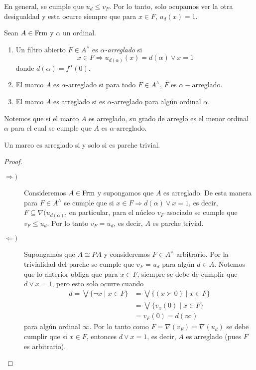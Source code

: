 En general, se cumple que $u_d\leq v_F$. Por lo tanto, solo ocupamos ver la otra desigualdad y esta ocurre siempre que para $x\in F$, $u_d(x)=1$. 

\begin{dfn}\label{Definición8.2.1}
    Sean $A\in \mathrm{Frm}$ y $\alpha$ un ordinal. 
    \begin{enumerate}
        \item Un filtro abierto $F\in A^\wedge$ es \emph{$\alpha$-arreglado} si 
    \[
    x\in F\Rightarrow u_{d(\alpha)}(x)=d(\alpha)\vee x=1
    \]
    donde $d(\alpha)=f^\alpha(0)$.
    
    \item El marco $A$ es $\alpha$-arreglado si para todo $F\in A^\wedge$, $F$ es $\alpha-$arreglado.

    \item El marco $A$ es arreglado si es $\alpha$-arreglado para algún ordinal $\alpha$.
    \end{enumerate}
\end{dfn}

Notemos que si el marco $A$ es arreglado, su grado de arreglo es el menor ordinal $\alpha$ para el cual se cumple que $A$ es $\alpha$-arreglado.

\begin{lem}\label{Lema8.2.2}
    Un marco es arreglado si y solo si es parche trivial.
\end{lem}

\begin{proof}
    \begin{description}
        \item[$\Rightarrow )$] Consideremos $A\in \mathrm{Frm}$ y supongamos que $A$ es arreglado. De esta manera para $F\in A^\wedge$ se cumple que si $x\in F\Rightarrow d(\alpha)\vee x=1$, es decir, $F\subseteq \nabla(u_{d(\alpha)}$, en particular, para el núcleo $v_F$ asociado se cumple que $v_F\leq u_d$. Por lo tanto $v_F=u_d$, es decir, $A$ es parche trivial.

        \item[$\Leftarrow )$] Supongamos que $A\cong PA$ y consideremos $F\in A^\wedge$ arbitrario. Por la trivialidad del parche se cumple que $v_F=u_d$ para algún $d\in A$. Notemos que lo anterior obliga que para $x\in F$, siempre se debe de cumplir que $d\vee x=1$, pero esto solo ocurre cuando 
        \[
        \begin{split}
        d=\bigvee \{\neg x\mid x\in F\}&=\bigvee\{(x\succ 0)\mid x\in F\}\\
        &=\dot{\bigvee}\{v_x(0)\mid x\in F\}\\
        &=v_F(0)=d(\infty)
        \end{split}
        \]
        para algún ordinal $\infty$. Por lo tanto como $F=\nabla(v_F)=\nabla(u_d)$ se debe cumplir que si $x\in F$, entonces $d\vee x=1$, es decir, $A$ es arreglado (pues $F$ es arbitrario). 
    \end{description}
\end{proof}

